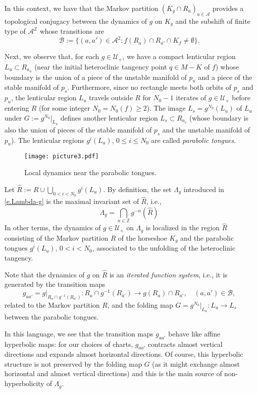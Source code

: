\documentclass[12pt]{amsart}
\numberwithin{equation}{section}
\theoremstyle{definition}
\newcommand{\<}{{\langle}}
\renewcommand{\>}{{\rangle}}
\begin{document}
In this context, we have that the Markov partition $(K_g\cap R_a)_{a\in\mathcal{A}}$ provides a topological conjugacy between the dynamics of $g$ on $K_g$ and the subshift of finite type of $\mathcal{A}^{\mathbb{Z}}$ whose transitions are 
$$\mathcal{B}:=\{(a,a')\in\mathcal{A}^2: f(R_a)\cap R_{a'}\cap K_f\neq\emptyset\}.$$

Next, we observe that, for each $g\in\mathcal{U}_+$, we have a compact lenticular region $L_u\subset R_{a_u}$ (near the initial heteroclinic tangency point $q\in M-K$ of $f$)
whose boundary is the union of a piece of the unstable manifold of $p_u$ and a piece of the stable manifold of $p_s$. Furthermore, since no rectangle meets both orbits of $p_s$ and $p_u$, the lenticular region $L_u$ travels outside $R$ for $N_0-1$ iterates of $g\in\mathcal{U}_+$ before entering $R$ (for some integer $N_0=N_0(f)\geq 2$). The image $L_s=g^{N_0}(L_u)$ of $L_u$ under $G:=g^{N_0}|_{L_u}$ defines another lenticular region $L_s\subset R_{a_s}$ (whose boundary is also the union of pieces of the stable manifold of $p_s$ and the unstable manifold of $p_u$). The lenticular regions $g^{i}(L_u)$, $0\leq i\leq N_0$ are called \emph{parabolic tongues}.

\begin{figure}[htb!]
\texttt{[image: picture3.pdf]}
\caption{Local dynamics near the parabolic tongues.}
\end{figure}

Let $\widehat{R}:=R\cup\bigcup\limits_{0<i<N_0} g^i(L_u)$. By definition, the set $\Lambda_g$ introduced in \eqref{e.Lambda-g} is the maximal invariant set of $\widehat{R}$, i.e., 
$$\Lambda_g=\bigcap\limits_{n\in\mathbb{Z}} g^{-n}(\widehat{R})$$
In other terms, the dynamics of $g\in\mathcal{U}_+$ on $\Lambda_g$ is localized in the region $\widehat{R}$ consisting of the Markov partition $R$ of the horseshoe $K_g$ and the parabolic tongues $g^i(L_u)$, $0<i<N_0$, associated to the unfolding of the heteroclinic tangency. 

Note that the dynamics of $g$ on $\widehat{R}$ is an \emph{iterated function system}, i.e., it is generated by the transition maps 
$$g_{aa'}=g|_{R_a\cap g^{-1}(R_{a'})}:R_a\cap g^{-1}(R_{a'})\to g(R_a)\cap R_{a'}, \quad (a,a')\in\mathcal{B},$$
related to the Markov partition $R$, and the folding map $G=g^{N_0}|_{L_u}:L_u\to L_s$ between the parabolic tongues.

In this language, we see that the transition maps $g_{aa'}$ behave like affine hyperbolic maps: for our choices of charts, $g_{aa'}$ contracts almost vertical directions and expands almost horizontal directions. Of course, this hyperbolic structure is not preserved by the folding map $G$ (as it might exchange almost horizontal and almost vertical directions) and this is the main source of non-hyperbolicity of $\Lambda_g$. 
\end{document}
